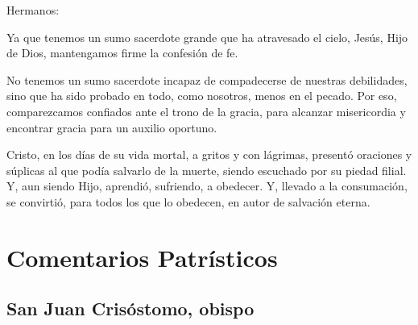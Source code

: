 \begin{scripture}
Hermanos: 

Ya que tenemos un sumo sacerdote grande que ha atravesado el cielo, Jesús, Hijo de Dios, mantengamos firme la confesión de fe. 

No tenemos un sumo sacerdote incapaz de compadecerse de nuestras debilidades, sino que ha sido probado en todo, como nosotros, menos en el pecado. Por eso, comparezcamos confiados ante el trono de la gracia, para alcanzar misericordia y encontrar gracia para un auxilio oportuno. 

Cristo, en los días de su vida mortal, a gritos y con lágrimas, presentó oraciones y súplicas al que podía salvarlo de la muerte, siendo escuchado por su piedad filial. Y, aun siendo Hijo, aprendió, sufriendo, a obedecer. Y, llevado a la consumación, se convirtió, para todos los que lo obedecen, en autor de salvación eterna.
\end{scripture}



 





\newsection
\section{Comentarios Patrísticos}

\subsection{San Juan Crisóstomo, obispo}



